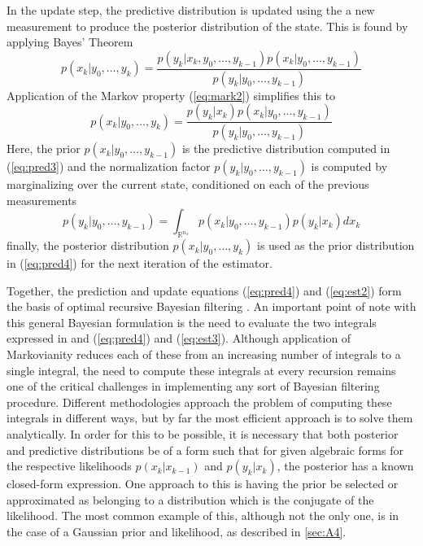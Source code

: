 In the update step, the predictive distribution is updated using the a new measurement to produce the posterior distribution of the state. This is found by applying Bayes' Theorem
\begin{equation} \label{eq:est1}
    p(x_{k}|y_{0},\hdots,y_{k}) = \frac{p(y_{k}|x_{k},y_{0},\hdots,y_{k-1})p(x_{k}|y_{0},\hdots,y_{k-1})}{p(y_{k}|y_{0},\hdots,y_{k-1})}
\end{equation}
Application of the Markov property (\ref{eq:mark2}) simplifies this to
\begin{equation} \label{eq:est2}
    p(x_{k}|y_{0},\hdots,y_{k}) = \frac{p(y_{k}|x_{k})p(x_{k}|y_{0},\hdots,y_{k-1})}{p(y_{k}|y_{0},\hdots,y_{k-1})}
\end{equation}
Here, the prior $p(x_{k}|y_{0},\hdots,y_{k-1})$ is the predictive distribution computed in (\ref{eq:pred3}) and the normalization factor $p(y_{k}|y_{0},\hdots,y_{k-1})$ is computed by marginalizing over the current state, conditioned on each of the previous measurements
\begin{equation} \label{eq:est3}
    p(y_{k}|y_{0},\hdots,y_{k-1}) = \int_{\mathbb{R}^{n_{x}}} p(x_{k}|y_{0},\hdots,y_{k-1})p(y_{k}|x_{k}) dx_{k}
\end{equation}
finally, the posterior distribution $p(x_{k}|y_{0},\hdots,y_{k})$ is used as the prior distribution in (\ref{eq:pred4}) for the next iteration of the estimator.

Together, the prediction and update equations (\ref{eq:pred4}) and (\ref{eq:est2}) form the basis of optimal recursive Bayesian filtering \cite{Arulampalam02,Arasaratnam09a}. An important point of note with this general Bayesian formulation is the need to evaluate the two integrals expressed in and (\ref{eq:pred4}) and (\ref{eq:est3}). Although application of Markovianity reduces each of these from an increasing number of integrals to a single integral, the need to compute these integrals at every recursion remains one of the critical challenges in implementing any sort of Bayesian filtering procedure. Different methodologies approach the problem of computing these integrals in different ways, but by far the most efficient approach is to solve them analytically. In order for this to be possible, it is necessary that both posterior and predictive distributions be of a form such that for given algebraic forms for the respective likelihoods $p(x_{k}|x_{k-1})$ and $p(y_{k}|x_{k})$, the posterior has a known closed-form expression. One approach to this is having the prior be selected or approximated as belonging to a distribution which is the conjugate of the likelihood. The most common example of this, although not the only one, is in the case of a Gaussian prior and likelihood, as described in \ref{sec:A4}.

